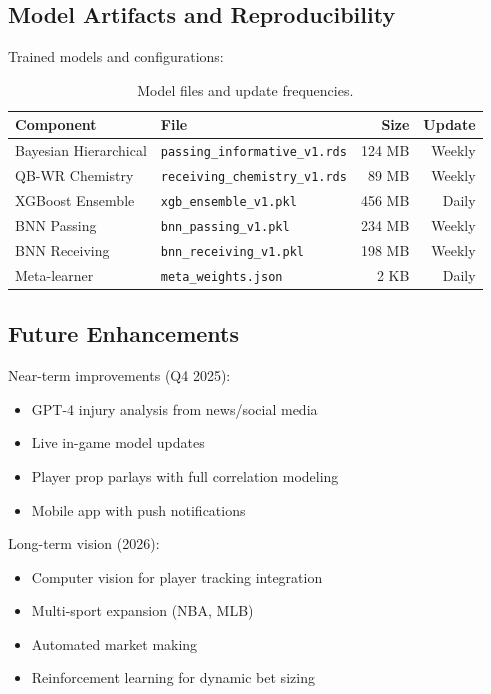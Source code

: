 \subsection{Model Artifacts and Reproducibility}

Trained models and configurations:

\begin{table}[!ht]
\centering
\small
\caption[v3.0 Model artifacts]{Model files and update frequencies.}
\label{tab:v3-artifacts}
\begin{tabular}{llrr}
\toprule
\textbf{Component}  & \textbf{File}  & \textbf{Size}  & \textbf{Update} \\
\midrule
Bayesian Hierarchical & \texttt{passing\_informative\_v1.rds} & 124 MB & Weekly \\
QB-WR Chemistry & \texttt{receiving\_chemistry\_v1.rds} & 89 MB & Weekly \\
XGBoost Ensemble & \texttt{xgb\_ensemble\_v1.pkl} & 456 MB & Daily \\
BNN Passing & \texttt{bnn\_passing\_v1.pkl} & 234 MB & Weekly \\
BNN Receiving & \texttt{bnn\_receiving\_v1.pkl} & 198 MB & Weekly \\
Meta-learner & \texttt{meta\_weights.json} & 2 KB & Daily \\
\bottomrule
\end{tabular}
\end{table}

\subsection{Future Enhancements}

Near-term improvements (Q4 2025):
\begin{itemize}
  \item GPT-4 injury analysis from news/social media
  \item Live in-game model updates
  \item Player prop parlays with full correlation modeling
  \item Mobile app with push notifications
\end{itemize}

Long-term vision (2026):
\begin{itemize}
  \item Computer vision for player tracking integration
  \item Multi-sport expansion (NBA, MLB)
  \item Automated market making
  \item Reinforcement learning for dynamic bet sizing
\end{itemize}

